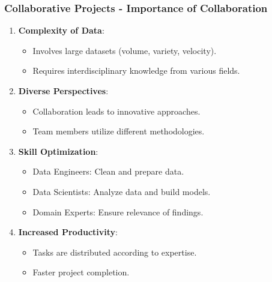 \documentclass{beamer}
\begin{document}
\begin{frame}[fragile]
    \frametitle{Collaborative Projects - Importance of Collaboration}
    
    \begin{enumerate}
        \item \textbf{Complexity of Data}:
        \begin{itemize}
            \item Involves large datasets (volume, variety, velocity).
            \item Requires interdisciplinary knowledge from various fields.
        \end{itemize}
        
        \item \textbf{Diverse Perspectives}:
        \begin{itemize}
            \item Collaboration leads to innovative approaches.
            \item Team members utilize different methodologies.
        \end{itemize}
        
        \item \textbf{Skill Optimization}:
        \begin{itemize}
            \item Data Engineers: Clean and prepare data.
            \item Data Scientists: Analyze data and build models.
            \item Domain Experts: Ensure relevance of findings.
        \end{itemize}
        
        \item \textbf{Increased Productivity}:
        \begin{itemize}
            \item Tasks are distributed according to expertise.
            \item Faster project completion.
        \end{itemize}
    \end{enumerate}
\end{frame}
\end{document}
